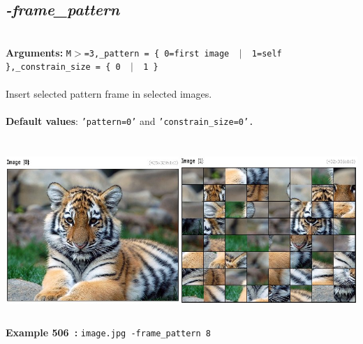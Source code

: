 \documentclass[a4paper,11pt,twoside]{book}
\begin{document}
\subsection{\emph{-frame\_pattern} }\vspace*{-0.5em}
~\\\textbf{Arguments: } 
{\small \texttt{M$>$=3,\_pattern = \{ 0=first image ~$|$~ 1=self \},\_constrain\_size = \{ 0 ~$|$~ 1 \}}}\\~\\
Insert selected pattern frame in selected images.
~\\~\\\textbf{Default values}: {\small \texttt{'pattern=0'} and \texttt{'constrain\_size=0'.}}
\begin{center}\includegraphics[keepaspectratio=true,height=7cm,width=\textwidth]{img/gmic_def506.jpg}\\
{\footnotesize \textbf{Example 506~:} \texttt{image.jpg -frame\_pattern 8}}
\end{center}
\end{document}
